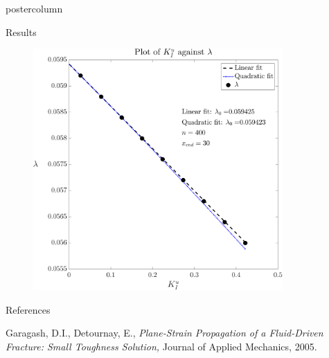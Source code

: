 \documentclass{beamer}
\begin{document}
\begin{frame}
\begin{columns}
\begin{column}{.57\textwidth}
\begin{beamercolorbox}[center]{postercolumn}
\begin{minipage}{.98\textwidth}
{\begin{myblock}{Results}
\begin{figure}
\begin{minipage}{0.55\textwidth}
\end{minipage}
\begin{minipage}{0.37\textwidth}
\centering\includegraphics[width=0.85\textwidth]{./../Graphs/l0.pdf}
\end{minipage}
\end{figure}
\end{myblock}\vfill
\begin{myblock}{References}
\footnotesize
\begin{thebibliography}{9}  
%
Garagash, D.I., Detournay, E.,
\emph{Plane-Strain Propagation of a Fluid-Driven Fracture: Small Toughness
Solution,}
Journal of Applied Mechanics,
2005.
%
%
\end{thebibliography}
%
%
\end{myblock}\vfill
}\end{minipage}\end{beamercolorbox}
\end{column}
\end{columns}
\end{frame}
\end{document}
